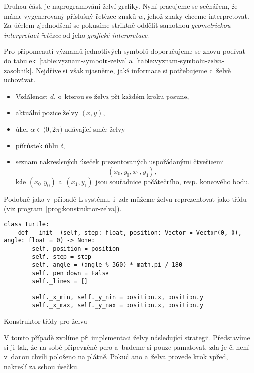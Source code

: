 Druhou částí je naprogramování želví grafiky. Nyní pracujeme se scénářem, že máme vygenerovaný příslušný řetězec znaků $w$, jehož znaky chceme interpretovat. Za účelem zjednodšení se pokusíme striktně oddělit samotnou \emph{geometrickou interpretaci řetězce} od jeho \emph{grafické interpretace}.

Pro připomenutí významů jednotlivých symbolů doporučujeme se znovu podívat do tabulek~\ref{table:vyznam-symbolu-zelva} a~\ref{table:vyznam-symbolu-zelva-zasobnik}. Nejdříve si však ujasněme, jaké informace si potřebujeme o~želvě uchovávat.
\begin{itemize}
    \item Vzdálenost $d$, o~kterou se želva při každém kroku posune,
    \item aktuální pozice želvy $(x,y)$,
    \item úhel $\alpha\in\langle 0,2\pi)$ udávající směr želvy
    \item přírůstek úhlu $\delta$,
    \item seznam nakreslených úseček prezentovaných uspořádanými čtveřicemi
    \[(x_0,y_0,x_1,y_1),\]
    kde $(x_0,y_0)$ a~$(x_1,y_1)$ jsou souřadnice počátečního, resp. koncového bodu.
\end{itemize}
Podobně jako v~případě L-systému, i~zde můžeme želvu reprezentovat jako třídu (viz program~\ref{prog:konstruktor-zelva}).
\begin{program}[h]
\begin{lstlisting}[style=python]
class Turtle:
    def __init__(self, step: float, position: Vector = Vector(0, 0), angle: float = 0) -> None:
        self._position = position
        self._step = step
        self._angle = (angle % 360) * math.pi / 180
        self._pen_down = False
        self._lines = []

        self._x_min, self._y_min = position.x, position.y
        self._x_max, self._y_max = position.x, position.y
\end{lstlisting}
    \caption{Konstruktor třídy pro želvu}
    \label{prog:konstruktor-zelva}
\end{program}

V tomto případě zvolíme při implementaci želvy následující strategii. Představíme si ji tak, že na sobě připevněné pero a~budeme si pouze pamatovat, zda je či není v~danou chvíli položeno na plátně. Pokud ano a~želva provede krok vpřed, nakreslí za sebou úsečku.

